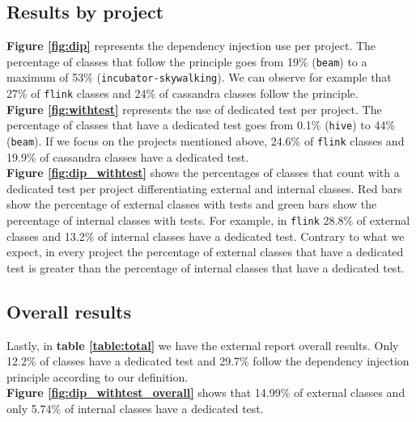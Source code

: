 \documentclass[11pt, a4paper, twocolumn]{article}
\begin{document}
\subsection{Results by project}
\textbf{Figure \ref{fig:dip}} represents the dependency injection use per project. The percentage of classes that follow the principle goes from 19\% (\texttt{beam}) to a maximum of 53\% (\texttt{incubator-skywalking}). We can observe for example that 27\% of \texttt{flink} classes and 24\% of cassandra classes follow the principle.\\
\textbf{Figure \ref{fig:withtest}} represents the use of dedicated test per project. The percentage of classes that have a dedicated test goes from 0.1\% (\texttt{hive}) to 44\% (\texttt{beam}). If we focus on the projects mentioned above, 24.6\% of \texttt{flink} classes and 19.9\% of cassandra classes have a dedicated test.\\
\textbf{Figure \ref{fig:dip_withtest}} shows the percentages of classes that count with a dedicated test per project differentiating external and internal classes. Red bars show the percentage of external classes with tests and green bars show the percentage of internal classes with tests. For example, in \texttt{flink} 28.8\% of  external classes and 13.2\% of internal classes have a dedicated test. Contrary to what we expect, in every project the percentage of external classes that have a dedicated test is greater than the percentage of internal classes that have a dedicated test.\\
\subsection{Overall results}
Lastly, in \textbf{table \ref{table:total}} we have the external report overall results. Only 12.2\% of classes have a dedicated test and 29.7\% follow the dependency injection principle according to our definition.\\
\textbf{Figure \ref{fig:dip_withtest_overall}} shows that 14.99\% of external classes and only 5.74\% of internal classes have a dedicated test.

\end{document}
